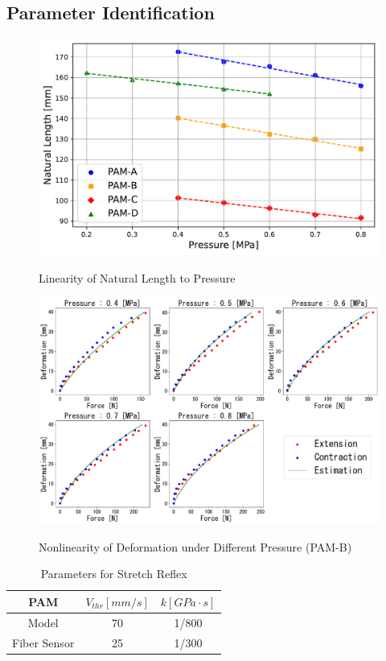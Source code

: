 \subsection{Parameter Identification}
\begin{figure}[t]
    \hfill
    \begin{minipage}{\columnwidth}
        \centering
        \includegraphics[width=\columnwidth]{fig/length_pressure.pdf} 
        \caption{Linearity of Natural Length to Pressure}
        \label{fig:length_pressure}
        \vspace{1em} 
        \includegraphics[width=\columnwidth]{fig/20231124_5_4s_2d_ieeesensors1.pdf}
        \caption{Nonlinearity of Deformation under Different Pressure (PAM-B)}
        \label{fig:pam_b_static1}
    \end{minipage}
\end{figure}
\begin{table}[t]
    \centering
    \caption{Parameters for Stretch Reflex} 
    \begin{tabular}{c|cc}
        \hline
        PAM &$V_{thr} [\si{mm/s}]$&$ k [\si{GPa\cdot s}]$\\
        \hline \hline
        Model & 70 & 1/800\\
        Fiber Sensor & 25 & 1/300\\
        \hline
    \end{tabular}
\label{tab:reflex_para}
\end{table}
